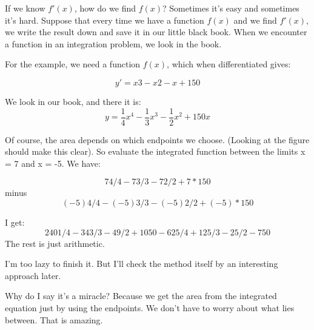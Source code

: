 \documentclass[11pt, oneside]{article}
\begin{document}
If we know $f'(x)$, how do we find $f(x)$? Sometimes it's easy and sometimes it's hard. Suppose that every time we have a function $f(x)$ and we find $f'(x)$, we write the result down and save it in our little black book. When we encounter a function in an integration problem, we look in the book.

For the example, we need a function $f(x)$, which when differentiated gives:

\[ y' = x3 - x2 - x + 150 \]

We look in our book, and there it is:
\[ y = \frac{1}{4}x^4 - \frac{1}{3} x^3 - \frac{1}{2} x^2 + 150 x \]

Of course, the area depends on which endpoints we choose. (Looking at the figure should make this clear). So evaluate the integrated function between the limits x = 7 and x = -5. We have:

\[ 74/4 - 73/3 - 72/2 + 7*150 \]
minus
\[ (-5)4/4 - (-5)3/3 - (-5)2/2 + (-5)*150 \]

I get:
\[ 2401/4 - 343/3 - 49/2 + 1050 - 625/4 + 125/3 - 25/2 - 750 \]
The rest is just arithmetic.

I'm too lazy to finish it. But I'll check the method itself by an interesting approach later.

Why do I say it's a miracle? Because we get the area from the integrated equation just by using the endpoints. We don't have to worry about what lies between. That is amazing.
\end{document}
